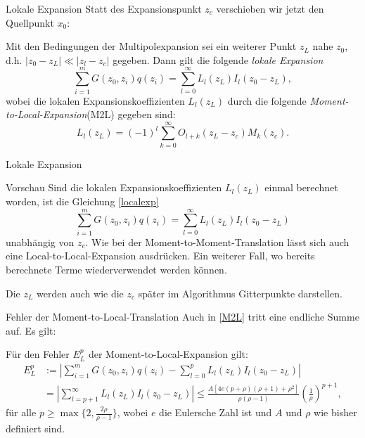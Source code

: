 \documentclass[ngerman]{beamer}
\begin{document}
\begin{frame}{Lokale Expansion}
Statt des Expansionspunkt $z_c$ verschieben wir jetzt den Quellpunkt $x_0$:
\begin{Satz}
Mit den Bedingungen der Multipolexpansion sei ein weiterer Punkt $z_L$ nahe $z_0$, d.h. $|z_0-z_L|\ll |z_l-z_c|$ gegeben. Dann gilt die folgende \emph{lokale Expansion}
\begin{equation}\label{localexp}
\sum_{i=1}^m {G(z_0,z_i)q(z_i)} = \sum_{l=0}^\infty L_l(z_L)I_l(z_0-z_L),
\end{equation}
wobei die lokalen Expansionskoeffizienten $L_l(z_L)$ durch die folgende \emph{Moment-to-Local-Expansion}(M2L) gegeben sind:
\begin{equation}\label{M2L}
L_l(z_L)=(-1)^l\sum_{k=0}^\infty O_{l+k}(z_L-z_c)M_k(z_c).
\end{equation}
\end{Satz}
\end{frame}

\begin{frame}{Lokale Expansion}
\begin{block}{Vorschau}
Sind die lokalen Expansionskoeffizienten $L_l(z_L)$ einmal berechnet worden, ist die Gleichung \eqref{localexp} 
\[\sum_{i=1}^m {G(z_0,z_i)q(z_i)} = \sum_{l=0}^\infty L_l(z_L)I_l(z_0-z_L)
\]
unabhängig von $z_c$. Wie bei der Moment-to-Moment-Translation lässt sich auch eine Local-to-Local-Expansion ausdrücken. Ein weiterer Fall, wo bereits berechnete Terme wiederverwendet werden können.

Die $z_L$ werden auch wie die $z_c$ später im Algorithmus Gitterpunkte darstellen.
\end{block}
\end{frame}

\begin{frame}{Fehler der Moment-to-Local-Translation}
Auch in \eqref{M2L} tritt eine endliche Summe auf. Es gilt:
\begin{Satz}
Für den Fehler $E_L^p$ der Moment-to-Local-Expansion gilt:
\begin{align*}
E^p_L&:= \left|\sum_{i=1}^m {G(z_0,z_i)q(z_i)} - \sum_{l=0}^p L_l(z_L)I_l(z_0-z_L)\right|\\
&=\left|\sum_{l=p+1}^\infty L_l(z_L)I_l(z_0-z_L)\right| \leq \frac{A\left[4e(p+\rho)(\rho+1)+\rho^2\right]}{\rho(\rho-1)}\left(\frac{1}{\rho}\right)^{p+1},
\end{align*}
für alle $p\geq \max\{2, \frac{2\rho}{\rho-1}\}$, wobei $e$ die Eulersche Zahl ist und $A$ und $\rho$ wie bisher definiert sind.
\end{Satz}
\end{frame}
\end{document}
